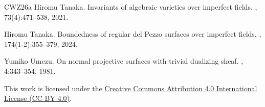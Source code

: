 \documentclass[reqno,oneside]{amsart}
\theoremstyle{definition}
\theoremstyle{plain}
\numberwithin{equation}{section}
\begin{document}
\begin{thebibliography}{CWZ26a}
Hiromu Tanaka.
\newblock Invariants of algebraic varieties over imperfect fields.
, 73(4):471--538, 2021.

Hiromu Tanaka.
\newblock Boundedness of regular del {P}ezzo surfaces over imperfect fields.
, 174(1-2):355--379, 2024.

Yumiko Umezu.
\newblock On normal projective surfaces with trivial dualizing sheaf.
, 4:343--354, 1981.

\end{thebibliography}
\par\bigskip
{\footnotesize\noindent
This work is licensed under the
\href{https://creativecommons.org/licenses/by/4.0/}{Creative Commons Attribution 4.0 International License (CC BY 4.0)}.\par}
\end{document}
